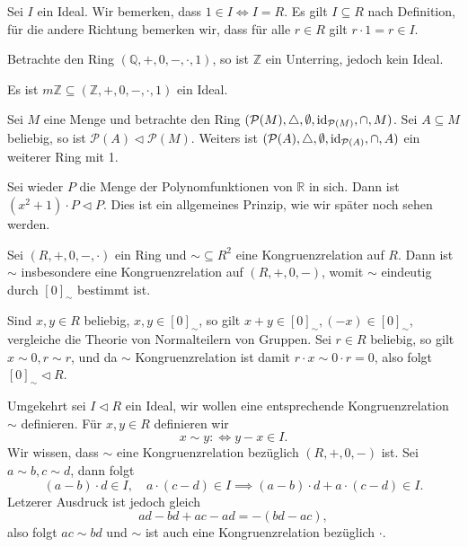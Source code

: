 \begin{remark}
    Sei $I$ ein Ideal. Wir bemerken, dass $1 \in I \Leftrightarrow I = R$. Es gilt $I \subseteq R$ nach Definition, für die andere Richtung bemerken wir, dass für alle $r \in R$ gilt $r \cdot 1 = r \in I$.
\end{remark}

\begin{example}
    Betrachte den Ring $(\mathbb{Q}, +, 0, -, \cdot, 1)$, so ist $\mathbb{Z}$ ein Unterring, jedoch kein Ideal.
\end{example}

\begin{example}
    Es ist $m \mathbb{Z} \subseteq (\mathbb{Z}, +, 0, -, \cdot, 1)$ ein Ideal.
\end{example}

\begin{example}
    Sei $M$ eine Menge und betrachte den Ring $(\mathcal{P}(M), \triangle, \emptyset, \operatorname{id}_{\mathcal{P}(M)}, \cap, M)$. Sei $A \subseteq M$ beliebig, so ist $\mathcal{P}(A) \vartriangleleft \mathcal{P}(M)$. Weiters ist $(\mathcal{P}(A), \triangle, \emptyset, \operatorname{id}_{\mathcal{P}(A)}, \cap, A)$ ein weiterer Ring mit 1.
\end{example}

\begin{example}
    Sei wieder $P$ die Menge der Polynomfunktionen von $\mathbb{R}$ in sich. Dann ist $(x^2 + 1) \cdot P \vartriangleleft P$. Dies ist ein allgemeines Prinzip, wie wir später noch sehen werden.
\end{example}

\begin{remark}
    Sei $(R, +, 0, -, \cdot)$ ein Ring und $\sim \subseteq R^2$ eine Kongruenzrelation auf $R$. Dann ist $\sim$ insbesondere eine Kongruenzrelation auf $(R, +, 0, -)$, womit $\sim$ eindeutig durch $[0]_{\sim}$ bestimmt ist.

    Sind $x, y \in R$ beliebig, $x, y \in [0]_{\sim}$, so gilt $x + y \in [0]_{\sim}, (-x) \in [0]_{\sim}$, vergleiche die Theorie von Normalteilern von Gruppen. Sei $r \in R$ beliebig, so gilt $x \sim 0, r \sim r$, und da $\sim$ Kongruenzrelation ist damit $r \cdot x \sim 0 \cdot r = 0$, also folgt $[0]_{\sim} \vartriangleleft R$.

    Umgekehrt sei $I \vartriangleleft R$ ein Ideal, wir wollen eine entsprechende Kongruenzrelation $\sim$ definieren. Für $x, y \in R$ definieren wir
    $$ x \sim y :\Leftrightarrow y - x \in I. $$
    Wir wissen, dass $\sim$ eine Kongruenzrelation bezüglich $(R, +, 0, -)$ ist. Sei $a \sim b, c \sim d$, dann folgt
    $$ (a-b) \cdot d \in I, \quad a \cdot (c - d) \in I \implies (a-b)\cdot d + a\cdot(c-d) \in I. $$
    Letzerer Ausdruck ist jedoch gleich
    $$ ad - bd + ac - ad = -(bd - ac), $$
    also folgt $ac \sim bd$ und $\sim$ ist auch eine Kongruenzrelation bezüglich $\cdot$.
\end{remark}

